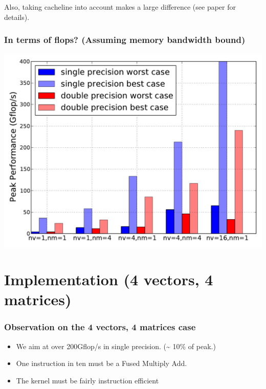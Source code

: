 \documentclass{beamer}
\begin{document}
\begin{frame}
\begin{columns}
  \end{columns}

  \tiny Also, taking cacheline into account makes a large difference (see paper for details).
\end{frame}

\begin{frame}
  \frametitle{In terms of flops? (Assuming memory bandwidth bound)}

  \includegraphics[width=.9\linewidth]{slides-figures/ICS-figures/gflops_peak.pdf}

\end{frame}


\section{Implementation (4 vectors, 4 matrices)}

\begin{frame}
  \frametitle{Observation on the 4 vectors, 4 matrices case}

  \begin{itemize}
  \item We aim at over 200Gflop/s in single precision. (\~{}  10\% of peak.)
  \item One instruction in ten must be a Fused Multiply Add.
  \item The kernel must be fairly instruction efficient
  \end{itemize}
\end{frame}
\end{document}
